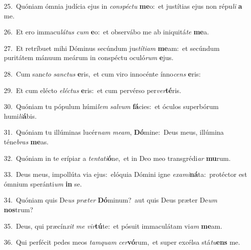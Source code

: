 {\numbfont\textcolor{\numbcolor}{25.}}~Quóniam ómnia judícia ejus in \textit{con}\-\textit{spéc}\textit{tu} \textbf{me}\-o:~\star et justítias ejus non répu\textit{li} \textbf{a} me.\par
{\numbfont\textcolor{\numbcolor}{26.}}~Et ero immacu\-\textit{lá}\-\textit{tus} \textit{cum} \textbf{e}\-o:~\star et observábo me ab iniquitá\textit{te} \textbf{me}\-a.\par
{\numbfont\textcolor{\numbcolor}{27.}}~Et retríbuet mihi Dóminus secúndum jus\-\textit{tí}\-\textit{ti}\textit{am} \textbf{me}\-am:~\star et secúndum puritátem mánuum meárum in conspéctu oculó\textit{rum} \textbf{e}\-jus.\par
{\numbfont\textcolor{\numbcolor}{28.}}~Cum sanc\textit{to} \textit{sanc}\-\textit{tus} \textbf{e}\-ris,~\star et cum viro innocénte ínno\textit{cens} \textbf{e}\-ris:\par
{\numbfont\textcolor{\numbcolor}{29.}}~Et cum elécto \textit{e}\-\textit{léc}\textit{tus} \textbf{e}\-ris:~\star et cum pervérso per\-\textit{ver}\-\textbf{té}ris.\par
{\numbfont\textcolor{\numbcolor}{30.}}~Quóniam tu pópulum húmi\textit{lem} \textit{sal}\-\textit{vum} \textbf{fá}\-cies:~\star et óculos superbórum humi\-\textit{li}\-\textbf{á}bis.\par
{\numbfont\textcolor{\numbcolor}{31.}}~Quóniam tu illúminas lucér\textit{nam} \textit{me}\-\textit{am}, \textbf{Dó}\-mine:~\star Deus meus, illúmina téne\textit{bras} \textbf{me}\-as.\par
{\numbfont\textcolor{\numbcolor}{32.}}~Quóniam in te erípiar a \textit{ten}\-\textit{ta}\textit{ti}\textbf{ó}ne,~\star et in Deo meo transgrédi\textit{ar} \textbf{mu}\-rum.\par
{\numbfont\textcolor{\numbcolor}{33.}}~Deus meus, impollúta via ejus:~\dagger elóquia Dómini igne \textit{ex}\-\textit{a}\textit{mi}\textbf{ná}ta:~\star protéctor est ómnium speránti\textit{um} \textbf{in} se.\par
{\numbfont\textcolor{\numbcolor}{34.}}~Quóniam quis De\textit{us} \textit{præ}\-\textit{ter} \textbf{Dó}\-minum?~\star aut quis Deus præter De\textit{um} \textbf{nos}\-trum?\par
{\numbfont\textcolor{\numbcolor}{35.}}~Deus, qui præcín\textit{xit} \textit{me} \textit{vir}\-\textbf{tú}te:~\star et pósuit immaculátam vi\textit{am} \textbf{me}\-am.\par
{\numbfont\textcolor{\numbcolor}{36.}}~Qui perfécit pedes meos \textit{tam}\-\textit{quam} \textit{cer}\-\textbf{vó}rum,~\star et super excélsa stá\-\textit{tu}\-\textbf{ens} me.\par
